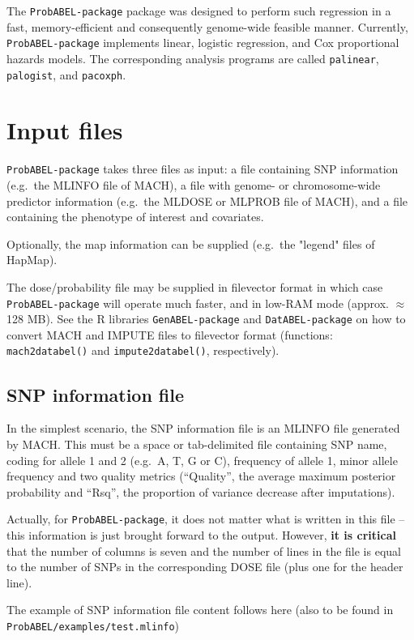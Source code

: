 \documentclass[12pt,a4paper]{article}
\newcommand{\PA}{\texttt{ProbABEL-package}}
\newcommand{\GA}{\texttt{GenABEL-package}}
\newcommand{\DA}{\texttt{DatABEL-package}}
\begin{document}
The \PA{} package was designed to perform such regression
in a fast, memory-efficient and consequently genome-wide feasible manner.
Currently, \PA{} implements linear, logistic regression,
and Cox proportional hazards models. The corresponding analysis
programs are called \texttt{palinear},  \texttt{palogist},
and \texttt{pacoxph}.


\section{Input files}
\PA{} takes three files as input: a file containing SNP
information (e.g.~the MLINFO file of MACH), a file with genome- or
chromosome-wide predictor information (e.g.~the MLDOSE or MLPROB file of MACH),
and a file containing the phenotype of interest and covariates.

Optionally, the map information can be supplied (e.g.~the "legend"
files of HapMap).

The dose/probability file may be supplied in filevector format
in which case \PA{} will operate much faster, and
in low-RAM mode (approx. $\approx$ 128 MB). See the R libraries \GA{} and
\DA{} on how to convert MACH and IMPUTE files to
filevector format (functions: \texttt{mach2databel()} and
\texttt{impute2databel()}, respectively).

\subsection{SNP information file}
\label{ssec:infoin}
In the simplest scenario, the SNP information file is an MLINFO
file generated by MACH. This must be a space or tab-delimited file
containing SNP name, coding for allele 1 and 2 (e.g.~A, T, G or C),
frequency of allele 1, minor allele frequency and two quality
metrics (``Quality'', the average maximum posterior probability and
``Rsq'', the proportion of variance decrease after imputations).

Actually,
for \PA{}, it does not matter what is written in this file --
this information is just brought forward to the output. However,
\textbf{it is critical} that the number of columns is seven and the number
of lines in the file is equal to the number of SNPs in the
corresponding DOSE file (plus one for the header line).

The example of SNP information file content follows here (also
to be found in \texttt{ProbABEL/examples/test.mlinfo})


\end{document}
